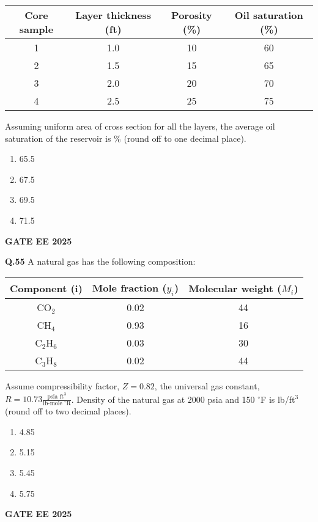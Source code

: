 \documentclass{article}
\begin{document}
\begin{center}
\begin{tabular}{|c|c|c|c|}
\hline
Core sample & Layer thickness (ft) & Porosity (\%) & Oil saturation (\%) \\
\hline
1 & 1.0 & 10 & 60 \\
2 & 1.5 & 15 & 65 \\
3 & 2.0 & 20 & 70 \\
4 & 2.5 & 25 & 75 \\
\hline
\end{tabular}
\end{center}

Assuming uniform area of cross section for all the layers, the average oil saturation of the reservoir is \underline{\hspace{1cm}} \% (round off to one decimal place).
\begin{enumerate}[label=(\Alph*)]
    \item 65.5
    \item 67.5
    \item 69.5
    \item 71.5
\end{enumerate}
\textbf{GATE EE 2025}

\vspace{0.5cm}

\textbf{Q.55} A natural gas has the following composition:

\begin{center}
\begin{tabular}{|c|c|c|}
\hline
Component (i) & Mole fraction ($y_i$) & Molecular weight ($M_i$) \\
\hline
CO$_2$ & 0.02 & 44 \\
CH$_4$ & 0.93 & 16 \\
C$_2$H$_6$ & 0.03 & 30 \\
C$_3$H$_8$ & 0.02 & 44 \\
\hline
\end{tabular}
\end{center}

Assume compressibility factor, $Z = 0.82$, the universal gas constant, $R = 10.73 \frac{\text{psia ft}^3}{\text{lb-mole }^\circ\text{R}}$. Density of the natural gas at 2000 psia and 150 $^\circ$F is \underline{\hspace{1cm}} lb/ft$^3$ (round off to two decimal places).
\begin{enumerate}[label=(\Alph*)]
    \item 4.85
    \item 5.15
    \item 5.45
    \item 5.75
\end{enumerate}
\textbf{GATE EE 2025}
\end{document}
